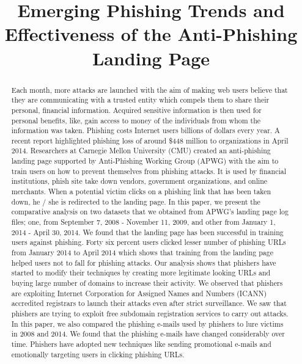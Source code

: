 \documentclass[conference]{IEEEtran}
\begin{document}
\title{Emerging Phishing Trends and Effectiveness of the Anti-Phishing Landing Page}

\author{
}

\maketitle
\begin{abstract}
Each month, more attacks are launched with the aim of making web users believe that they are communicating with a trusted entity which compels them to share their personal, financial information. Acquired sensitive information is then used for personal benefits, like, gain access to money of the individuals from whom the information was taken. Phishing costs Internet users billions of dollars every year. A recent report highlighted phishing loss of around \$448 million to organizations in April 2014. Researchers at Carnegie Mellon University (CMU) created an anti-phishing landing page supported by Anti-Phishing Working Group (APWG) with the aim to train users on how to prevent themselves from phishing attacks. It is used by financial institutions, phish site take down vendors, government organizations, and online merchants. When a potential victim clicks on a phishing link that has been taken down, he / she is redirected to the landing page. In this paper, we present the comparative analysis on two datasets that we obtained from APWG's landing page log files; one, from September 7, 2008 - November 11, 2009, and other from January 1, 2014 - April 30, 2014. We found that the landing page has been successful in training users against phishing. Forty six percent users clicked lesser number of phishing URLs from January 2014 to April 2014 which shows that training from the landing page helped users not to fall for phishing attacks. Our analysis shows that phishers have started to modify their techniques by creating more legitimate looking URLs and buying large number of domains to increase their activity. We observed that phishers are exploiting Internet Corporation for Assigned Names and Numbers (ICANN) accredited registrars to launch their attacks even after strict surveillance. We saw that phishers are trying to exploit free subdomain registration services to carry out attacks. In this paper, we also compared the phishing e-mails used by phishers to lure victims in 2008 and 2014. We found that the phishing e-mails have changed considerably over time. Phishers have adopted new techniques like sending promotional e-mails and emotionally targeting users in clicking phishing URLs.
\end{abstract}
\end{document}
